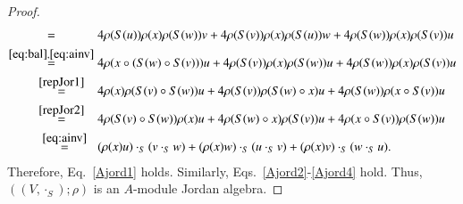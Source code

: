 \documentclass[12pt, reqno, a4paper]{amsart}
\theoremstyle{definition}
\begin{document}
\begin{proof}
\begin{align*}
		\overset{\hphantom{\eqref{eq:bal},\eqref{eq:ainv}}}{=}\; & 4\rho(S( u ))\rho(x) \rho(S(w)) v
		 + 4\rho(S( v ))\rho(x) \rho(S(u)) w
		 + 4\rho(S( w ))\rho(x) \rho(S(v)) u \\
		\overset{\eqref{eq:bal},\eqref{eq:ainv}}{=}\; & 4\rho(x \circ (S(w) \circ S(v)))u
		 + 4\rho(S( v ))\rho(x) \rho(S(w)) u
		 + 4\rho(S( w ))\rho(x) \rho(S(v)) u \\
		\overset{\;\;\;\;\eqref{repJor1}\;\;\;\;}{=}\; & 4\rho(x) \rho (S(v) \circ S(w))u
		 + 4\rho(S( v ))\rho ( S(w)\circ x) u
		 + 4\rho(S( w ))\rho ( x \circ S(v) ) u \\
		\overset{\;\;\;\;\eqref{repJor2}\;\;\;\;}{=}\; & 4\rho (S(v) \circ S(w))\rho(x)u
		 + 4\rho ( S(w)\circ x) \rho(S( v ))u
		 + 4\rho ( x \circ S(v) ) \rho(S( w ))u \\
		\overset{\;\;\;\eqref{eq:ainv}\;\;\;}{=}\; & (\rho(x)u) \cdot_{S} (v \cdot_{S} w) + (\rho(x)w) \cdot_{S} (u \cdot_{S} v) + (\rho(x)v) \cdot_{S} (w \cdot_{S} u).
	\end{align*}
	Therefore, Eq.~\eqref{Ajord1} holds. 
	Similarly, Eqs.~\eqref{Ajord2}-\eqref{Ajord4} hold. 
	Thus, $((V, \cdot_{S}); \rho)$ is an $A$-module Jordan algebra.
\end{proof}
\end{document}
